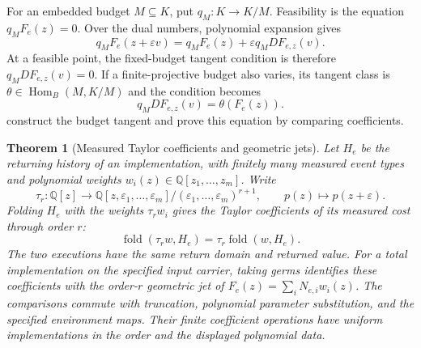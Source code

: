 \documentclass[11pt,a4paper]{article}
\numberwithin{algorithm}{section}
\numberwithin{equation}{section}
\newtheorem{theorem}{Theorem}[section]
\theoremstyle{definition}
\theoremstyle{remark}
\theoremstyle{plain}
\newcommand{\QQ}{\mathbb Q}
\newcommand{\eps}{\varepsilon}
\newcommand{\Hom}{\operatorname{Hom}}
\theoremstyle{definition}
\theoremstyle{plain}
\begin{document}
For an embedded budget $M\subseteq K$, put $q_M:K\to K/M$.
Feasibility is the equation $q_MF_e(z)=0$. Over the dual numbers,
polynomial expansion gives
\[
 q_MF_e(z+\eps v)=q_MF_e(z)+\eps q_MDF_{e,z}(v).
\]
At a feasible point, the fixed-budget tangent condition is therefore
$q_MDF_{e,z}(v)=0$. If a finite-projective budget also varies, its
tangent class is $\theta\in\Hom_B(M,K/M)$ and the condition becomes
\[
 q_MDF_{e,z}(v)=\theta(F_e(z)).
\]
 construct
the budget tangent and prove this equation by comparing coefficients.

\begin{theorem}[Measured Taylor coefficients and geometric jets]
\label{thm:measured-jet-adequacy}
Let $H_e$ be the returning history of an implementation, with
finitely many measured event types and polynomial weights
$w_i(z)\in\QQ[z_1,\ldots,z_m]$. Write
\[
 \tau_r:\QQ[z]\longrightarrow
 \QQ[z,\eps_1,\ldots,\eps_m]/(\eps_1,\ldots,\eps_m)^{r+1},
 \qquad p(z)\longmapsto p(z+\eps).
\]
Folding $H_e$ with the weights $\tau_rw_i$ gives the Taylor coefficients
of its measured cost through order $r$:
\begin{equation}\label{eq:measured-jet-fold}
 \operatorname{fold}(\tau_rw,H_e)
 =\tau_r\operatorname{fold}(w,H_e).
\end{equation}
The two executions have the same return domain and returned value.
For a total implementation on the specified input carrier, taking
germs identifies these coefficients with the order-$r$ geometric jet
of $F_e(z)=\sum_iN_{e,i}w_i(z)$. The comparisons commute with truncation,
polynomial parameter substitution, and the specified environment maps.
Their finite coefficient operations have uniform implementations in
the order and the displayed polynomial data.
\end{theorem}
\end{document}
